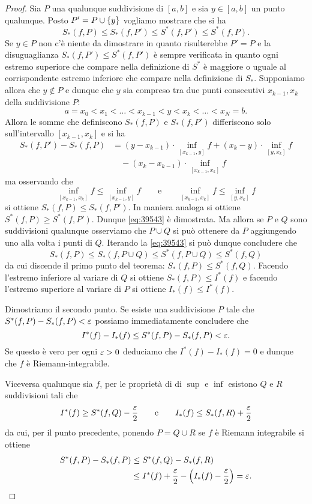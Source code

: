\begin{proof}
Sia $P$ una qualunque suddivisione di $[a,b]$ e sia $y\in [a,b]$ un punto qualunque. Posto $P' = P \cup {\left\{ y \right\}}$ vogliamo mostrare
che si ha
\begin{equation}\label{eq:39543}
  S_*(f,P) \le S_*(f,P') \le S^*(f,P') \le S^*(f,P).
\end{equation}
Se $y\in P$ non c'è niente da dimostrare in quanto
risulterebbe $P'=P$ e la disuguaglianza $S_*(f,P') \le S^*(f,P')$ è sempre verificata in quanto ogni estremo superiore che compare nella definizione di $S^*$ è maggiore o uguale al corrispondente
estremo inferiore che compare nella definizione di $S_*$.
Supponiamo allora che $y \not \in P$ e dunque che $y$ sia compreso tra due punti consecutivi $x_{k-1}, x_k$ della suddivisione $P$:
\[
  a= x_0 < x_1 < \dots < x_{k-1} < y < x_k < \dots < x_N=b.
\]
Allora le somme che definiscono $S_*(f,P)$ e $S_*(f,P')$ differiscono solo sull'intervallo $[x_{k-1},x_k]$ e si ha
\begin{align*}
  S_*(f,P') - S_*(f,P)
  &= (y-x_{k-1})\cdot \!\!\inf_{[x_{k-1},y]}\!\!\! f
  + (x_k - y)\cdot\! \inf_{[y,x_k]}\! f\\
  &\quad - (x_k - x_{k-1})\cdot \!\!\inf_{[x_{k-1}, x_k]}\!\!\!f
\end{align*}
ma osservando che
\[
\inf_{[x_{k-1}, x_k]}\!\!f
\le\inf_{[x_{k-1},y]}\!\! f
\qquad \text{e} \qquad
\inf_{[x_{k-1}, x_k]}\!\!f
\le\inf_{[y,x_k]}\!\! f
\]
si ottiene $S_*(f,P) \le S_*(f,P')$.
In maniera analoga si ottiene $S^*(f,P) \ge S^*(f,P')$.
Dunque \eqref{eq:39543} è dimostrata.
Ma allora se $P$ e $Q$ sono suddivisioni qualunque osserviamo che $P\cup Q$ si può ottenere da $P$ aggiungendo uno alla volta i punti di $Q$. Iterando la \eqref{eq:39543} si può dunque concludere che
\[
 S_*(f,P) \le S_*(f,P\cup Q) \le S^*(f,P\cup Q) \le S^*(f,Q)
\]
da cui discende il primo punto del teorema: $S_*(f,P) \le S^*(f,Q)$.
Facendo l'estremo inferiore al variare di $Q$
si ottiene $S_*(f,P) \le I^*(f)$ e facendo l'estremo superiore al variare di $P$ si ottiene $I_*(f) \le I^*(f)$.

Dimostriamo il secondo punto.
Se esiste una suddivisione $P$ tale che $S^*(f,P)-S_*(f,P) < \varepsilon$ possiamo immediatamente concludere che
\[
I^*(f) - I_*(f) \le S^*(f,P) - S_*(f,P) < \varepsilon.
\]
Se questo è vero per ogni $\varepsilon >0$ deduciamo che $I^*(f) - I_*(f) = 0$ e dunque che $f$ è Riemann-integrabile.

Viceversa qualunque sia $f$, per le proprietà di
di $\sup$ e $\inf$
esistono $Q$ e $R$ suddivisioni tali che
\[
  I^*(f) \ge S^*(f,Q) - \frac{\varepsilon} 2
  \qquad\text{e}\qquad
  I_*(f) \le S_*(f,R) + \frac{\varepsilon} 2
\]
da cui, per il punto precedente, ponendo $P=Q\cup R$
se $f$ è Riemann integrabile
si ottiene
\begin{align*}
S^*(f,P)-S_*(f,P) &\le S^*(f,Q) - S_*(f,R) \\
&\le I^*(f) + \frac{\varepsilon} 2 - {\left( I_*(f) - \frac {\varepsilon} 2 \right)} = \varepsilon.
\end{align*}


\end{proof}
